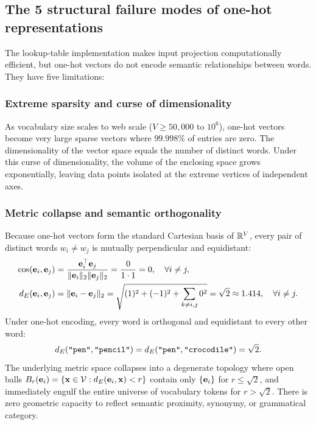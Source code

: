 \documentclass[../../../main.tex]{subfiles}
\begin{document}
\subsection{The 5 structural failure modes of one-hot representations}
\label{subsec:five_failure_modes}

The lookup-table implementation makes input projection computationally efficient, but one-hot vectors do not encode semantic relationships between words. They have five limitations:

\subsubsection{Extreme sparsity and curse of dimensionality}
As vocabulary size scales to web scale ($V \ge 50{,}000$ to $10^6$), one-hot vectors become very large sparse vectors where $99.998\%$ of entries are zero. The dimensionality of the vector space equals the number of distinct words. Under this curse of dimensionality, the volume of the enclosing space grows exponentially, leaving data points isolated at the extreme vertices of independent axes.

\subsubsection{Metric collapse and semantic orthogonality}
Because one-hot vectors form the standard Cartesian basis of $\mathbb{R}^V$, every pair of distinct words $w_i \neq w_j$ is mutually perpendicular and equidistant:
\begin{align}
\label{eq:onehot_cosine}
\cos(\mathbf{e}_i, \mathbf{e}_j) &= \frac{\mathbf{e}_i^\top \mathbf{e}_j}{\|\mathbf{e}_i\|_2 \|\mathbf{e}_j\|_2} = \frac{0}{1 \cdot 1} = 0, \quad \forall i \neq j, \\
\label{eq:onehot_l2}
d_E(\mathbf{e}_i, \mathbf{e}_j) &= \|\mathbf{e}_i - \mathbf{e}_j\|_2 = \sqrt{(1)^2 + (-1)^2 + \sum_{k \neq i, j} 0^2} = \sqrt{2} \approx 1.414, \quad \forall i \neq j.
\end{align}
Under one-hot encoding, every word is orthogonal and equidistant to every other word:
\begin{equation}
\label{eq:equidistance_paradox}
d_E(\text{\texttt{"pen"}}, \text{\texttt{"pencil"}}) = d_E(\text{\texttt{"pen"}}, \text{\texttt{"crocodile"}}) = \sqrt{2}.
\end{equation}
The underlying metric space collapses into a degenerate topology where open balls $B_r(\mathbf{e}_i) = \{\mathbf{x} \in \mathcal{V} : d_E(\mathbf{e}_i, \mathbf{x}) < r\}$ contain only $\{\mathbf{e}_i\}$ for $r \le \sqrt{2}$, and immediately engulf the entire universe of vocabulary tokens for $r > \sqrt{2}$. There is zero geometric capacity to reflect semantic proximity, synonymy, or grammatical category.
\end{document}
